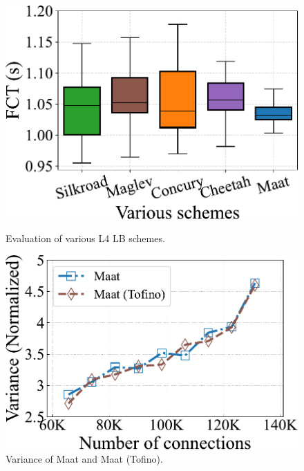 \begin{figure}[h]
	\setlength{\abovecaptionskip}{0pt}
	\setlength{\belowcaptionskip}{-10pt}
	\centering
	\begin{minipage}{0.245\textwidth}
		\centering
		\includegraphics[width=1\textwidth]{experiment/8boxplotfct.pdf}
		\caption{Evaluation of various L4 LB schemes.}
		\label{13}
	\end{minipage}
	\begin{minipage}{0.245\textwidth}
		\centering
		\includegraphics[width=1\textwidth]{experiment/9var.pdf}
		\caption{Variance of Maat and Maat (Tofino).}
		\label{14}
	\end{minipage}
	\begin{minipage}{0.245\textwidth}
		\centering

\end{minipage}
\end{figure}
